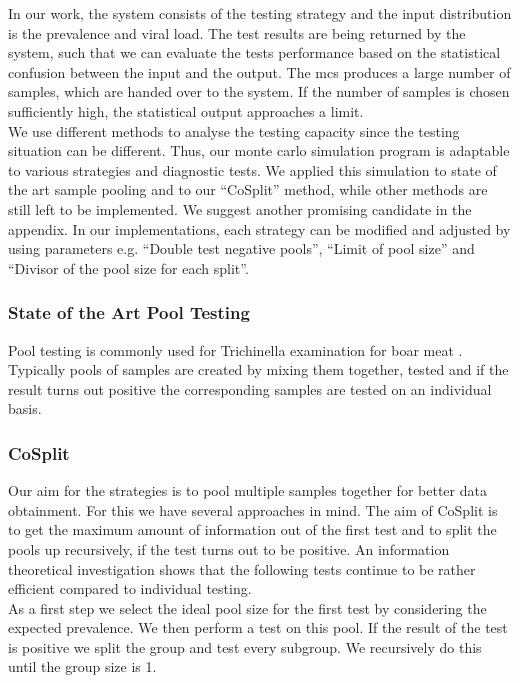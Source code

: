 \documentclass[fleqn,10pt]{wlscirep}
\begin{document}
In our work, the system consists of the testing strategy and the input distribution is the prevalence and viral load. The test results are being returned by the system, such that we can evaluate the tests performance based on the statistical confusion between the input and the output. The {mcs} produces a large number of samples, which are handed over to the system. If the number of samples is chosen sufficiently high, the statistical output approaches a limit.\\

We use different methods to analyse the testing capacity since the testing situation can be different. Thus, our monte carlo simulation program is adaptable to various strategies and diagnostic tests. We applied this simulation to state of the art sample pooling and to our “CoSplit” method, while other methods are still left to be implemented. We suggest another promising candidate in the appendix. In our implementations, each strategy can be modified and adjusted by using parameters e.g. “Double test negative pools”, “Limit of pool size” and “Divisor of the pool size for each split”.


\subsubsection{ State of the Art Pool Testing}

Pool testing is commonly used for Trichinella examination for boar meat \cite{Trichinen}. Typically pools of samples are created by mixing them together, tested and if the result turns out positive the corresponding samples are tested on an individual basis. 

\subsubsection{CoSplit}
Our aim for the strategies is to pool multiple samples together for better data obtainment. For this we have several approaches in mind. The aim of CoSplit is to get the maximum amount of information out of the first test and to split the pools up recursively, if the test turns out to be positive. An information theoretical investigation shows that the following tests continue to be rather efficient compared to individual testing.\\

As a first step we select the ideal pool size for the first test by considering the expected prevalence. We then perform a test on this pool. If the result of the test is positive we split the group and test every subgroup. We recursively do this until the group size is 1.\\
\end{document}
